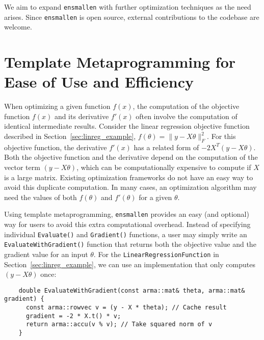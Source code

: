 \documentclass{article}
\begin{document}
We aim to expand {\tt ensmallen} with further optimization techniques
as the need arises.  Since {\tt ensmallen} is open source,
external contributions to the codebase are welcome.

\vspace*{-0.3em}
\section{Template Metaprogramming for Ease of Use and Efficiency}
\vspace*{-0.5em}

When optimizing a given function $f(x)$, the computation of
the objective function $f(x)$ and its derivative $f'(x)$ often involve the
computation of identical intermediate results.  Consider the linear regression
objective function described
in Section~\ref{sec:linreg_example}, $f(\theta) = \| y - X\theta \|_F^2$.
For this objective function, the derivative $f'(x)$ has a related form of
$-2 X^T (y -X \theta)$.  Both the objective function and the derivative 
depend on the computation of the vector term $(y - X \theta)$,
which can be computationally expensive to compute if $X$ is a large matrix.
Existing optimization frameworks do not have an easy way to avoid
this duplicate computation. In many cases, an optimization algorithm
may need the values of both $f(\theta)$ and $f'(\theta)$ for a given $\theta$.

Using template metaprogramming, {\tt ensmallen} provides an easy (and
optional) way for users to avoid this extra computational overhead.  Instead of
specifying individual {\tt Evaluate()} and {\tt Gradient()} functions, a user
may simply write an {\tt EvaluateWithGradient()} function that returns both the
objective value and the gradient value for an input $\theta$.  For the 
\texttt{LinearRegressionFunction} in Section~\ref{sec:linreg_example},
we can use an implementation that only computes $(y - X \theta)$ once:

\vspace*{-0.5em}
\begin{verbatim}
    double EvaluateWithGradient(const arma::mat& theta, arma::mat& gradient) {
      const arma::rowvec v = (y - X * theta); // Cache result
      gradient = -2 * X.t() * v;
      return arma::accu(v % v); // Take squared norm of v
    }
\end{verbatim}
\vspace*{-0.5em}
\end{document}

